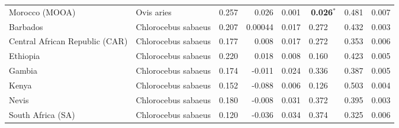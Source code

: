 \begin{center}
\begin{adjustbox}{width = 1\textwidth}
\begin{tabular}{|l|l|r|r|r|r|r|r|}
                 Morocco (MOOA) &           Ovis aries &                                              0.257 &                                              0.026 &            0.001 &                  \textbf{0.026}$\bm{^*}$ &                                              0.481 &              0.007 \\
                       Barbados &  Chlorocebus sabaeus &                                              0.207 &                                            0.00044 &            0.017 &                         0.272~~ &                                              0.432 &              0.003 \\
 Central African Republic (CAR) &  Chlorocebus sabaeus &                                              0.177 &                                              0.008 &            0.017 &                         0.272~~ &                                              0.353 &              0.006 \\
                       Ethiopia &  Chlorocebus sabaeus &                                              0.220 &                                              0.018 &            0.008 &                         0.160~~ &                                              0.423 &              0.005 \\
                         Gambia &  Chlorocebus sabaeus &                                              0.174 &                                             -0.011 &            0.024 &                         0.336~~ &                                              0.387 &              0.005 \\
                          Kenya &  Chlorocebus sabaeus &                                              0.152 &                                             -0.088 &            0.006 &                         0.126~~ &                                              0.503 &              0.004 \\
                          Nevis &  Chlorocebus sabaeus &                                              0.180 &                                             -0.008 &            0.031 &                         0.372~~ &                                              0.395 &              0.003 \\
              South Africa (SA) &  Chlorocebus sabaeus &                                              0.120 &                                             -0.036 &            0.034 &                         0.374~~ &                                              0.325 &              0.006 \\

\end{tabular}
\end{adjustbox}
\end{center}
